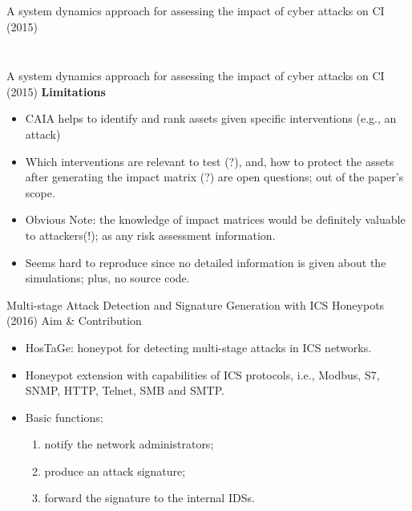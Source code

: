 \documentclass[compress]{beamer}
\begin{document}
\begin{frame}{A system dynamics approach for assessing the impact of cyber attacks on CI (2015)}
\begin{columns}
\begin{column}{0.6\textwidth}
\begin{figure}
      \label{fig:stealthy-operator-view}
      \end{figure}
     \end{column}
    \end{columns}
\end{frame}
\begin{frame}{A system dynamics approach for assessing the impact of cyber attacks on CI (2015)}
    \textbf{Limitations}
    \begin{itemize}
     \item CAIA helps to identify and rank assets given specific interventions (e.g., an attack)
     \item Which interventions are relevant to test (?), and, how to protect the assets after generating the impact matrix (?) are open questions; out of the paper's scope.
     \item Obvious Note: the knowledge of impact matrices would be definitely valuable to attackers(!); as any risk assessment information.
     \item Seems hard to reproduce since no detailed information is given about the simulations; plus, no source code.
    \end{itemize}
\end{frame}
\begin{frame}{Multi-stage Attack Detection and Signature Generation with ICS Honeypots (2016)}
    Aim \& Contribution
    \begin{itemize}
     \item HosTaGe: honeypot for detecting multi-stage attacks in ICS networks.
     \item Honeypot extension with capabilities of ICS protocols, i.e., Modbus, S7, SNMP, HTTP, Telnet, SMB and SMTP.
     \item Basic functions:
     \begin{enumerate}
      \item notify the network administrators;
      \item produce an attack signature;
      \item forward the signature to the internal IDSs.
     \end{enumerate}
    \end{itemize}
\end{frame}
\end{document}
